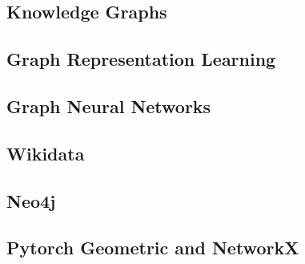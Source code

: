 \subsection{Knowledge Graphs}\label{subsec:introduction-knowledge-graphs}
\subsection{Graph Representation Learning}\label{subsec:introduction-graph-representation-learning}
\subsection{Graph Neural Networks}\label{subsec:introduction-graph-neural-networks}
\subsection{Wikidata}\label{subsec:introduction-wikidata}
\subsection{Neo4j}\label{subsec:introduction-neo4j}
\subsection{Pytorch Geometric and NetworkX}\label{subsec:introduction-pyg-nx}